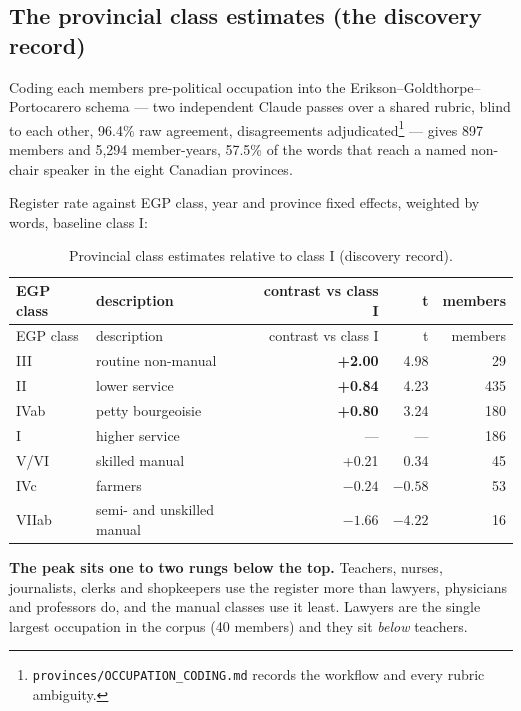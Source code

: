 \subsection{The provincial class estimates (the discovery record)}\label{sub:class-provincial}

Coding each member\textquotesingle s pre-political occupation into the
Erikson--Goldthorpe--Portocarero schema --- two independent Claude passes over a
shared rubric, blind to each other, 96.4\% raw agreement, disagreements
adjudicated\footnote{\texttt{provinces/\allowbreak{}OCCUPATION\_\allowbreak{}CODING.\allowbreak{}md} records the workflow and every
  rubric ambiguity.} --- gives 897 members and 5,294 member-years, 57.5\% of
the words that reach a named non-chair speaker in the eight Canadian
provinces.

Register rate against EGP class, year and province fixed effects, weighted by
words, baseline class I:

\begingroup\small
\begin{longtable}[]{@{}llrrr@{}}
\caption{Provincial class estimates relative to class I (discovery record).}\label{tab:class-provincial}\\
\toprule\noalign{}
EGP class & description & contrast vs class I & t & members \\
\midrule\noalign{}
\endfirsthead
\toprule\noalign{}
EGP class & description & contrast vs class I & t & members \\
\midrule\noalign{}
\endhead
\bottomrule\noalign{}
\endlastfoot
III & routine non-manual & \textbf{+2.00} & 4.98 & 29 \\
II & lower service & \textbf{+0.84} & 4.23 & 435 \\
IVab & petty bourgeoisie & \textbf{+0.80} & 3.24 & 180 \\
I & higher service & --- & --- & 186 \\
V/VI & skilled manual & +0.21 & 0.34 & 45 \\
IVc & farmers & \(-0.24\) & \(-0.58\) & 53 \\
VIIab & semi- and unskilled manual & \textbf{\(-1.66\)} & \(-4.22\) & 16 \\
\end{longtable}
\endgroup

\textbf{The peak sits one to two rungs below the top.} Teachers, nurses,
journalists, clerks and shopkeepers use the register more than lawyers,
physicians and professors do, and the manual classes use it least. Lawyers are
the single largest occupation in the corpus (40 members) and they sit \emph{below}
teachers.

